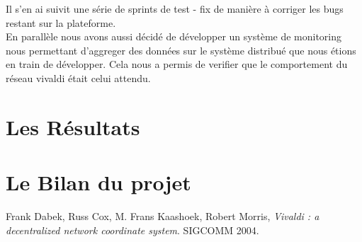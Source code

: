 \documentclass[11pt,a4paper]{article}
\begin{document}
Il s'en ai suivit une série de sprints de test - fix de manière à corriger les bugs restant sur la plateforme.\\

En parallèle nous avons aussi décidé de développer un système de monitoring nous permettant d'aggreger des données sur le système distribué que nous étions en train de développer. Cela nous a permis de verifier que le comportement du réseau vivaldi était celui attendu.

\section{Les Résultats}

\section{Le Bilan du projet}

\begin{thebibliography}{9}

  Frank Dabek, Russ Cox, M. Frans Kaashoek, Robert Morris,
  \emph{Vivaldi : a decentralized network coordinate system}.
  SIGCOMM 2004.

\end{thebibliography}
\end{document}
